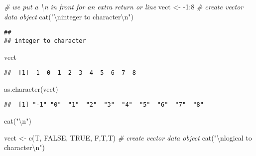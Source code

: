 \documentclass[
]{article}
\newenvironment{Shaded}{\begin{snugshade}}{\end{snugshade}}
\newcommand{\CommentTok}[1]{\textcolor[rgb]{0.56,0.35,0.01}{\textit{#1}}}
\newcommand{\ConstantTok}[1]{\textcolor[rgb]{0.00,0.00,0.00}{#1}}
\newcommand{\DecValTok}[1]{\textcolor[rgb]{0.00,0.00,0.81}{#1}}
\newcommand{\FunctionTok}[1]{\textcolor[rgb]{0.00,0.00,0.00}{#1}}
\newcommand{\NormalTok}[1]{#1}
\newcommand{\OtherTok}[1]{\textcolor[rgb]{0.56,0.35,0.01}{#1}}
\newcommand{\SpecialCharTok}[1]{\textcolor[rgb]{0.00,0.00,0.00}{#1}}
\newcommand{\StringTok}[1]{\textcolor[rgb]{0.31,0.60,0.02}{#1}}
\begin{document}
\begin{Shaded}
\begin{Highlighting}[]
\CommentTok{\# we put a \textbackslash{}n in front for an extra return or line}
\NormalTok{vect }\OtherTok{\textless{}{-}} \SpecialCharTok{{-}}\DecValTok{1}\SpecialCharTok{:}\DecValTok{8} \CommentTok{\# create vector data object}
\FunctionTok{cat}\NormalTok{(}\StringTok{"}\SpecialCharTok{\textbackslash{}n}\StringTok{integer to character}\SpecialCharTok{\textbackslash{}n}\StringTok{"}\NormalTok{)}
\end{Highlighting}
\end{Shaded}

\begin{verbatim}
## 
## integer to character
\end{verbatim}

\begin{Shaded}
\begin{Highlighting}[]
\NormalTok{vect}
\end{Highlighting}
\end{Shaded}

\begin{verbatim}
##  [1] -1  0  1  2  3  4  5  6  7  8
\end{verbatim}

\begin{Shaded}
\begin{Highlighting}[]
\FunctionTok{as.character}\NormalTok{(vect)}
\end{Highlighting}
\end{Shaded}

\begin{verbatim}
##  [1] "-1" "0"  "1"  "2"  "3"  "4"  "5"  "6"  "7"  "8"
\end{verbatim}

\begin{Shaded}
\begin{Highlighting}[]
\FunctionTok{cat}\NormalTok{(}\StringTok{"}\SpecialCharTok{\textbackslash{}n}\StringTok{"}\NormalTok{)}
\end{Highlighting}
\end{Shaded}

\begin{Shaded}
\begin{Highlighting}[]
\NormalTok{vect }\OtherTok{\textless{}{-}} \FunctionTok{c}\NormalTok{(T, }\ConstantTok{FALSE}\NormalTok{, }\ConstantTok{TRUE}\NormalTok{, F,T,T) }\CommentTok{\# create vector data object}
\FunctionTok{cat}\NormalTok{(}\StringTok{"}\SpecialCharTok{\textbackslash{}n}\StringTok{logical to character}\SpecialCharTok{\textbackslash{}n}\StringTok{"}\NormalTok{)}
\end{Highlighting}
\end{Shaded}
\end{document}

